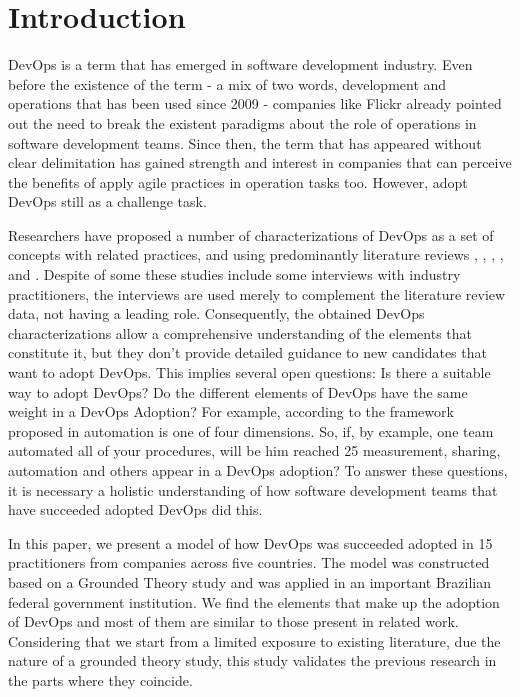 \section{Introduction}

DevOps is a term that has emerged in software development industry. Even before
the existence of the term - a mix of two words, development and operations that
has been used since 2009 - companies like Flickr \cite{flickr} already
pointed out the need to break the existent paradigms about the role of
operations in software development teams. Since then, the term that has appeared
without clear delimitation has gained strength and interest in companies that
can perceive the benefits of apply agile practices in operation tasks too.
However, adopt DevOps still as a challenge task.

Researchers have proposed a number of characterizations of DevOps as a set of
concepts with related practices, and using predominantly literature reviews
\cite{cooperation_dev_ops_esem_2014}, \cite{devops_a_definition_xp_15},
\cite{dimensions_of_devops_xp_15}, \cite{extending_dimensions_icsea_16},
\cite{characterizing_devops_sbes_2016} and
\cite{qualitative_devops_journalsw_17}. Despite of some these studies include
some interviews with industry practitioners, the interviews are used merely to
complement the literature review data, not having a leading role. Consequently,
the obtained DevOps characterizations allow a comprehensive understanding of
the elements that constitute it, but they don't provide detailed guidance to
new candidates that want to adopt DevOps. This implies several open questions:
Is there a suitable way to adopt DevOps? Do the different elements of DevOps
have the same weight in a DevOps Adoption? For example, according to the
framework proposed in \cite{dimensions_of_devops_xp_15} automation is one of four
dimensions. So, if, by example, one team automated all of your procedures,
will be him reached 25%
measurement, sharing, automation and others appear in a DevOps adoption? To
answer these questions, it is necessary a holistic understanding of how
software development teams that have succeeded adopted DevOps did this.

In this paper, we present a model of how DevOps was succeeded adopted in 15
practitioners from companies across five countries. The model was constructed
based on a Grounded Theory study and was applied in an important Brazilian
federal government institution. We find the elements that make up the adoption
of DevOps and most of them are similar to those present in related work.
Considering that we start from a limited exposure to existing literature,
due the nature of a grounded theory study, this study validates the previous
research in the parts where they coincide.


